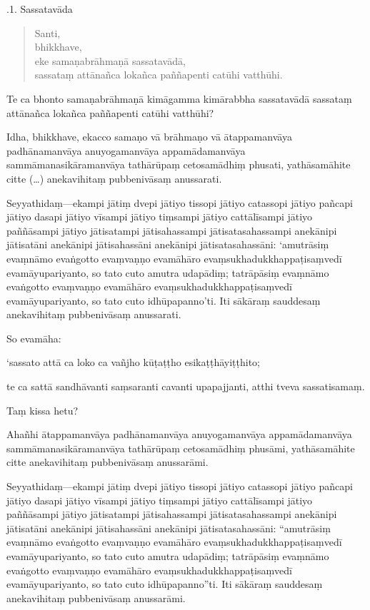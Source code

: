 \documentclass[11pt,twoside,openright]{book}
\begin{document}
.1. Sassatavāda
\pend

\begin{verse}
Santi,\\
\vin  bhikkhave,\\
\vin  eke samaṇabrāhmaṇā sassatavādā,\\
\vin  sassataṃ attānañca lokañca paññapenti catūhi vatthūhi.

\end{verse}
\pstart
Te ca bhonto samaṇabrāhmaṇā kimāgamma kimārabbha sassatavādā sassataṃ attānañca lokañca paññapenti catūhi vatthūhi?
\pend

\pstart
Idha, bhikkhave, ekacco samaṇo vā brāhmaṇo vā ātappamanvāya padhānamanvāya anuyogamanvāya appamādamanvāya sammāmanasikāramanvāya tathārūpaṃ cetosamādhiṃ phusati, yathāsamāhite citte (…) anekavihitaṃ pubbenivāsaṃ anussarati.
\pend

\pstart
Seyyathidaṃ—ekampi jātiṃ dvepi jātiyo tissopi jātiyo catassopi jātiyo pañcapi jātiyo dasapi jātiyo vīsampi jātiyo tiṃsampi jātiyo cattālīsampi jātiyo paññāsampi jātiyo jātisatampi jātisahassampi jātisatasahassampi anekānipi jātisatāni anekānipi jātisahassāni anekānipi jātisatasahassāni: ‘amutrāsiṃ evaṃnāmo evaṅgotto evaṃvaṇṇo evamāhāro evaṃsukhadukkhappaṭisaṃvedī evamāyupariyanto, so tato cuto amutra udapādiṃ; tatrāpāsiṃ evaṃnāmo evaṅgotto evaṃvaṇṇo evamāhāro evaṃsukhadukkhappaṭisaṃvedī evamāyupariyanto, so tato cuto idhūpapanno’ti. Iti sākāraṃ sauddesaṃ anekavihitaṃ pubbenivāsaṃ anussarati.
\pend

\pstart
So evamāha:
\pend

\pstart
‘sassato attā ca loko ca vañjho kūṭaṭṭho esikaṭṭhāyiṭṭhito;
\pend

\pstart
te ca sattā sandhāvanti saṃsaranti cavanti upapajjanti, atthi tveva sassatisamaṃ.
\pend

\pstart
Taṃ kissa hetu?
\pend

\pstart
Ahañhi ātappamanvāya padhānamanvāya anuyogamanvāya appamādamanvāya sammāmanasikāramanvāya tathārūpaṃ cetosamādhiṃ phusāmi, yathāsamāhite citte anekavihitaṃ pubbenivāsaṃ anussarāmi.
\pend

\pstart
Seyyathidaṃ—ekampi jātiṃ dvepi jātiyo tissopi jātiyo catassopi jātiyo pañcapi jātiyo dasapi jātiyo vīsampi jātiyo tiṃsampi jātiyo cattālīsampi jātiyo paññāsampi jātiyo jātisatampi jātisahassampi jātisatasahassampi anekānipi jātisatāni anekānipi jātisahassāni anekānipi jātisatasahassāni: “amutrāsiṃ evaṃnāmo evaṅgotto evaṃvaṇṇo evamāhāro evaṃsukhadukkhappaṭisaṃvedī evamāyupariyanto, so tato cuto amutra udapādiṃ; tatrāpāsiṃ evaṃnāmo evaṅgotto evaṃvaṇṇo evamāhāro evaṃsukhadukkhappaṭisaṃvedī evamāyupariyanto, so tato cuto idhūpapanno”ti. Iti sākāraṃ sauddesaṃ anekavihitaṃ pubbenivāsaṃ anussarāmi.
\pend
\end{document}

